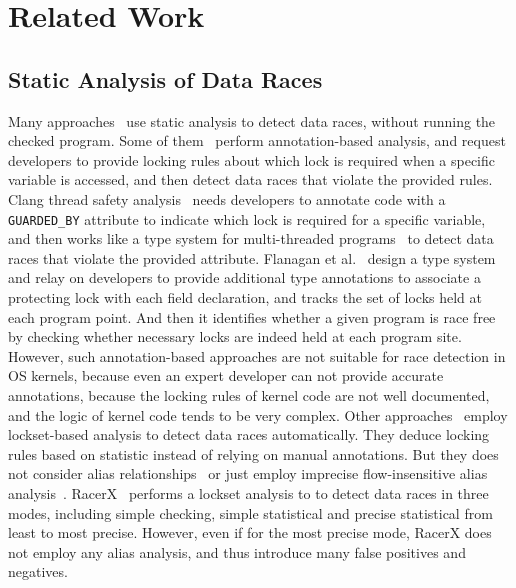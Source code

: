 \section{Related Work}
\label{sec_related}

\subsection{Static Analysis of Data Races}
\label{subsec_static}
Many approaches~\cite{Boyapati:OOPSLA02, Anderson:PLDI08, Anderson:PLDI09, 
Zhou:MICRO19, Flanagan:PASTE01, Flanagan:PLDI00, Sadowski:PLATEAU14, 
ClangThreadSafety, Blackshear:OOPSLA18, Choi:PLDI02, Engler:SOSP03, 
Voung:FSE07, Pratikakis:PLDI06, Naik:PLDI06} use static analysis to detect data 
races, without running the checked program. Some of 
them~\cite{Boyapati:OOPSLA02, Anderson:PLDI08, Anderson:PLDI09, Zhou:MICRO19, 
Flanagan:PASTE01, Flanagan:PLDI00, Sadowski:PLATEAU14, ClangThreadSafety} 
perform annotation-based analysis, and request developers to provide locking 
rules about which lock is required when a specific variable is accessed, and 
then detect data races that violate the provided rules. Clang thread safety 
analysis~\cite{ClangThreadSafety} needs developers to annotate code with a {\tt 
GUARDED\_BY} attribute to indicate which lock is required for a specific 
variable, and then works like a type system for multi-threaded 
programs~\cite{Vu:SoICT12, Boyapati:OOPSLA02, Marion:TAMC14} to detect data 
races that violate the provided attribute. Flanagan et 
al.~\cite{Flanagan:PLDI00} design a type system and relay on developers to 
provide additional type annotations to associate a protecting lock with each 
field declaration, and tracks the set of locks held at each program point. And 
then it identifies whether a given program is race free by checking whether 
necessary locks are indeed held at each program site. However, such 
annotation-based approaches are not suitable for race detection in OS kernels, 
because even an expert developer can not provide accurate annotations, because 
the locking rules of kernel code are not well documented, and the logic of 
kernel code tends to be very complex. Other 
approaches~\cite{Blackshear:OOPSLA18, Choi:PLDI02, Engler:SOSP03, Voung:FSE07, 
Pratikakis:PLDI06, Naik:PLDI06} employ lockset-based analysis to detect data 
races automatically. They deduce locking rules based on statistic instead of 
relying on manual annotations. But they does not consider alias 
relationships~\cite{Voung:FSE07, Engler:SOSP03} or just employ imprecise 
flow-insensitive alias analysis~\cite{Choi:PLDI02, 	Pratikakis:PLDI06, 
Naik:PLDI06}. RacerX~\cite{Engler:SOSP03} performs a lockset 
analysis to to detect data races in three modes, including simple checking, 
simple statistical and precise statistical from least to most precise. However, 
even if for the most precise mode, RacerX does not employ any alias analysis, 
and thus introduce many false positives and negatives.

